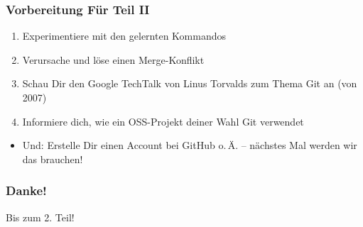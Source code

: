\documentclass{beamer}
\begin{document}
\begin{frame}
 \frametitle{Vorbereitung Für Teil II}
  


\begin{enumerate}
  \item Experimentiere mit den gelernten Kommandos
  \item Verursache und löse einen Merge-Konflikt
  \item Schau Dir den Google TechTalk von Linus Torvalds zum Thema Git an (von 2007)
  \item Informiere dich, wie ein OSS-Projekt deiner Wahl Git verwendet
\end{enumerate}

\begin{itemize}
  \item Und: Erstelle Dir einen Account bei GitHub o.\,Ä. -- nächstes Mal werden wir das brauchen!
\end{itemize}

  
 \end{frame}
\begin{frame}
 \frametitle{Danke!}
  




\vspace{0.5cm}
\begin{center}

Bis zum 2. Teil!


\vspace{.2cm}


\end{center}

  
\end{frame}
\end{document}
